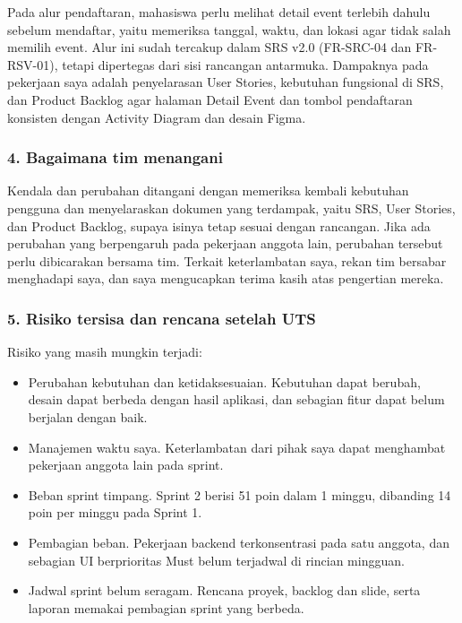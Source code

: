 \documentclass[11pt,a4paper]{article}
\begin{document}
Pada alur pendaftaran, mahasiswa perlu melihat detail event terlebih dahulu sebelum mendaftar, yaitu memeriksa tanggal, waktu, dan lokasi agar tidak salah memilih event. Alur ini sudah tercakup dalam SRS v2.0 (FR-SRC-04 dan FR-RSV-01), tetapi dipertegas dari sisi rancangan antarmuka. Dampaknya pada pekerjaan saya adalah penyelarasan User Stories, kebutuhan fungsional di SRS, dan Product Backlog agar halaman Detail Event dan tombol pendaftaran konsisten dengan Activity Diagram dan desain Figma.

\subsubsection*{4. Bagaimana tim menangani}

Kendala dan perubahan ditangani dengan memeriksa kembali kebutuhan pengguna dan menyelaraskan dokumen yang terdampak, yaitu SRS, User Stories, dan Product Backlog, supaya isinya tetap sesuai dengan rancangan. Jika ada perubahan yang berpengaruh pada pekerjaan anggota lain, perubahan tersebut perlu dibicarakan bersama tim. Terkait keterlambatan saya, rekan tim bersabar menghadapi saya, dan saya mengucapkan terima kasih atas pengertian mereka.

\subsubsection*{5. Risiko tersisa dan rencana setelah UTS}

Risiko yang masih mungkin terjadi:

\begin{itemize}

\item Perubahan kebutuhan dan ketidaksesuaian. Kebutuhan dapat berubah, desain dapat berbeda dengan hasil aplikasi, dan sebagian fitur dapat belum berjalan dengan baik.

\item Manajemen waktu saya. Keterlambatan dari pihak saya dapat menghambat pekerjaan anggota lain pada sprint.

\item Beban sprint timpang. Sprint 2 berisi 51 poin dalam 1 minggu, dibanding 14 poin per minggu pada Sprint 1.

\item Pembagian beban. Pekerjaan backend terkonsentrasi pada satu anggota, dan sebagian UI berprioritas Must belum terjadwal di rincian mingguan.

\item Jadwal sprint belum seragam. Rencana proyek, backlog dan slide, serta laporan memakai pembagian sprint yang berbeda.

\end{itemize}
\end{document}
